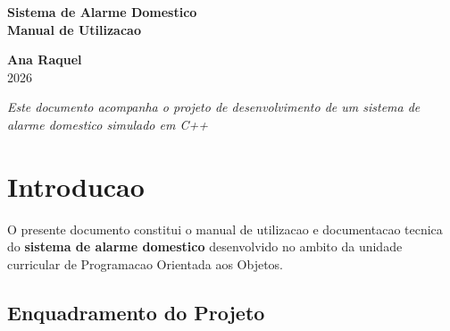 \documentclass[12pt,a4paper]{article}
\begin{document}
\begin{titlepage}
    \centering
    \vspace*{1cm}
    
    {\Huge\bfseries\textcolor{alarmecolor}{Sistema de Alarme Domestico}\\[0.3cm]
    \Large Manual de Utilizacao}
    
    \vspace{2cm}
    
    
    \vspace{3cm}
    
    {\Large\textbf{Ana Raquel}\\[0.5cm]
    \large 2026}
    
    \vspace{2cm}
    
    
    \vfill
    
    {\small\textit{Este documento acompanha o projeto de desenvolvimento de um sistema de alarme domestico simulado em C++}}
\end{titlepage}

\newpage
\tableofcontents
\newpage

\section{Introducao}

O presente documento constitui o manual de utilizacao e documentacao tecnica do \textbf{sistema de alarme domestico} desenvolvido no ambito da unidade curricular de Programacao Orientada aos Objetos.

\subsection{Enquadramento do Projeto}
\end{document}
